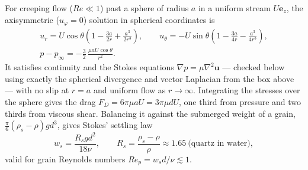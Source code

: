 \documentclass[11pt,letterpaper]{article}
\numberwithin{equation}{section}
\newcommand{\uu}{\mathbf{u}}
\newcommand{\e}[1]{\mathbf{e}_{#1}}
\begin{document}
\begin{worked}\label{we:stokesflow}
For creeping flow ($Re\ll1$) past a sphere of radius $a$ in a uniform stream $U\e{z}$, the axisymmetric ($u_\varphi=0$) solution in
spherical coordinates is
\begin{equation}\label{eq:stokessphere}
\begin{gathered}
u_r=U\cos\theta\left(1-\frac{3a}{2r}+\frac{a^3}{2r^3}\right),\qquad
u_\theta=-U\sin\theta\left(1-\frac{3a}{4r}-\frac{a^3}{4r^3}\right),\\
p-p_\infty=-\frac32\,\frac{\mu aU\cos\theta}{r^2}.
\end{gathered}
\end{equation}
It satisfies continuity and the Stokes equations $\nabla p=\mu\nabla^2\uu$ --- checked below using exactly the spherical divergence and
vector Laplacian from the box above --- with no slip at $r=a$ and uniform flow as $r\to\infty$. Integrating the stresses over the sphere
gives the drag $F_D=6\pi\mu aU=3\pi\mu dU$, one third from pressure and two thirds from viscous shear. Balancing it against the
submerged weight of a grain, $\tfrac{\pi}{6}(\rho_s-\rho)gd^3$, gives Stokes' settling law
\begin{equation}\label{eq:stokeslaw}
w_s=\frac{R_sgd^2}{18\nu},\qquad R_s=\frac{\rho_s-\rho}{\rho}\approx1.65\ \text{(quartz in water)},
\end{equation}
valid for grain Reynolds numbers $Re_p=w_sd/\nu\lesssim1$.
\end{worked}
\end{document}
